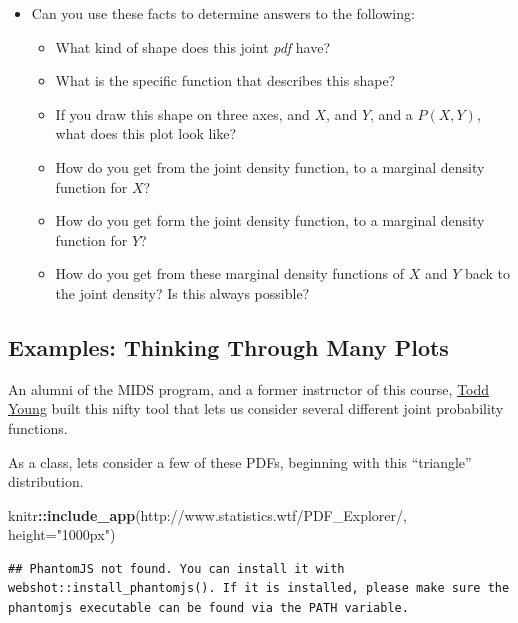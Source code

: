 \documentclass[
]{book}
\newenvironment{Shaded}{\begin{snugshade}}{\end{snugshade}}
\newcommand{\AttributeTok}[1]{\textcolor[rgb]{0.13,0.29,0.53}{#1}}
\newcommand{\FunctionTok}[1]{\textcolor[rgb]{0.13,0.29,0.53}{\textbf{#1}}}
\newcommand{\NormalTok}[1]{#1}
\newcommand{\SpecialCharTok}[1]{\textcolor[rgb]{0.81,0.36,0.00}{\textbf{#1}}}
\newcommand{\StringTok}[1]{\textcolor[rgb]{0.31,0.60,0.02}{#1}}
\providecommand{\tightlist}{%
  \setlength{\itemsep}{0pt}\setlength{\parskip}{0pt}}
\theoremstyle{definition}
\theoremstyle{definition}
\theoremstyle{definition}
\theoremstyle{definition}
\theoremstyle{remark}
\begin{document}
\begin{itemize}
\tightlist
\item
  Can you use these facts to determine answers to the following:

  \begin{itemize}
  \tightlist
  \item
    What kind of shape does this joint \emph{pdf} have?
  \item
    What is the specific function that describes this shape?
  \item
    If you draw this shape on three axes, and \(X\), and \(Y\), and a \(P(X,Y)\), what does this plot look like?
  \item
    How do you get from the joint density function, to a marginal density function for \(X\)?
  \item
    How do you get form the joint density function, to a marginal density function for \(Y\)?
  \item
    How do you get from these marginal density functions of \(X\) and \(Y\) back to the joint density? Is this always possible?
  \end{itemize}
\end{itemize}

\hypertarget{examples-thinking-through-many-plots}{%
\subsection{Examples: Thinking Through Many Plots}\label{examples-thinking-through-many-plots}}

An alumni of the MIDS program, and a former instructor of this course, \href{https://www.linkedin.com/in/dtoddyoung/}{Todd Young} built this nifty tool that lets us consider several different joint probability functions.

As a class, lets consider a few of these PDFs, beginning with this ``triangle'' distribution.

\begin{Shaded}
\begin{Highlighting}[]
\NormalTok{knitr}\SpecialCharTok{::}\FunctionTok{include\_app}\NormalTok{(}\StringTok{\textquotesingle{}http://www.statistics.wtf/PDF\_Explorer/\textquotesingle{}}\NormalTok{, }\AttributeTok{height=}\StringTok{"1000px"}\NormalTok{)}
\end{Highlighting}
\end{Shaded}

\begin{verbatim}
## PhantomJS not found. You can install it with webshot::install_phantomjs(). If it is installed, please make sure the phantomjs executable can be found via the PATH variable.
\end{verbatim}
\end{document}
